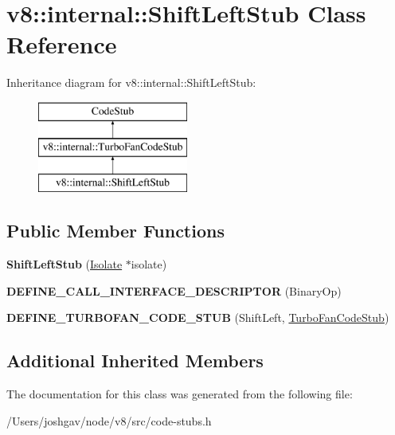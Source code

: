 \hypertarget{classv8_1_1internal_1_1_shift_left_stub}{}\section{v8\+:\+:internal\+:\+:Shift\+Left\+Stub Class Reference}
\label{classv8_1_1internal_1_1_shift_left_stub}
Inheritance diagram for v8\+:\+:internal\+:\+:Shift\+Left\+Stub\+:\begin{figure}[H]
\begin{center}
\leavevmode
\includegraphics[height=3.000000cm]{classv8_1_1internal_1_1_shift_left_stub}
\end{center}
\end{figure}
\subsection*{Public Member Functions}
\begin{DoxyCompactItemize}
\item 
{\bfseries Shift\+Left\+Stub} (\hyperlink{classv8_1_1internal_1_1_isolate}{Isolate} $\ast$isolate)\hypertarget{classv8_1_1internal_1_1_shift_left_stub_a9f052ef645f2decf73ab565af7cac454}{}\label{classv8_1_1internal_1_1_shift_left_stub_a9f052ef645f2decf73ab565af7cac454}

\item 
{\bfseries D\+E\+F\+I\+N\+E\+\_\+\+C\+A\+L\+L\+\_\+\+I\+N\+T\+E\+R\+F\+A\+C\+E\+\_\+\+D\+E\+S\+C\+R\+I\+P\+T\+OR} (Binary\+Op)\hypertarget{classv8_1_1internal_1_1_shift_left_stub_a536d1d264eb0eb04c329698ccfde1c27}{}\label{classv8_1_1internal_1_1_shift_left_stub_a536d1d264eb0eb04c329698ccfde1c27}

\item 
{\bfseries D\+E\+F\+I\+N\+E\+\_\+\+T\+U\+R\+B\+O\+F\+A\+N\+\_\+\+C\+O\+D\+E\+\_\+\+S\+T\+UB} (Shift\+Left, \hyperlink{classv8_1_1internal_1_1_turbo_fan_code_stub}{Turbo\+Fan\+Code\+Stub})\hypertarget{classv8_1_1internal_1_1_shift_left_stub_aae81116c9f1999d6b00e4dc0ab318678}{}\label{classv8_1_1internal_1_1_shift_left_stub_aae81116c9f1999d6b00e4dc0ab318678}

\end{DoxyCompactItemize}
\subsection*{Additional Inherited Members}


The documentation for this class was generated from the following file\+:\begin{DoxyCompactItemize}
\item 
/\+Users/joshgav/node/v8/src/code-\/stubs.\+h\end{DoxyCompactItemize}
